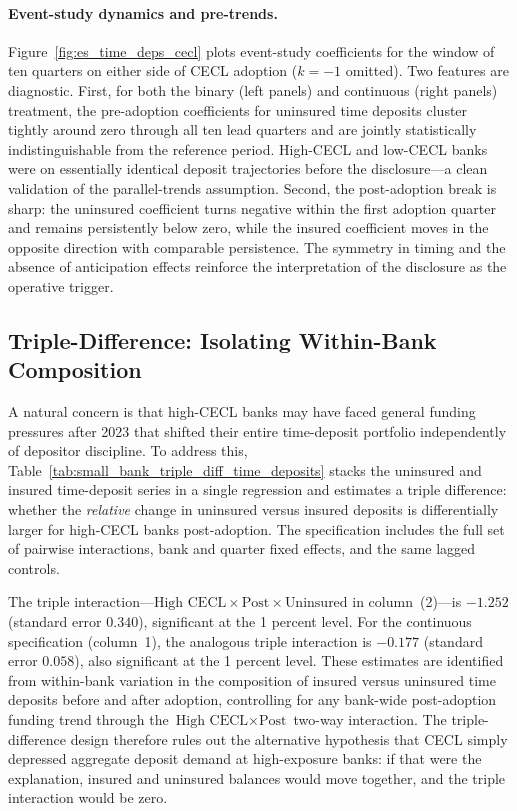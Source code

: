 \paragraph{Event-study dynamics and pre-trends.}
Figure~\ref{fig:es_time_deps_cecl} plots event-study coefficients for the
window of ten quarters on either side of CECL adoption ($k = -1$ omitted).
Two features are diagnostic. First, for both the binary (left panels) and
continuous (right panels) treatment, the pre-adoption coefficients for uninsured
time deposits cluster tightly around zero through all ten lead quarters and are
jointly statistically indistinguishable from the reference period. High-CECL and
low-CECL banks were on essentially identical deposit trajectories before the
disclosure---a clean validation of the parallel-trends assumption. Second, the
post-adoption break is sharp: the uninsured coefficient turns negative within the
first adoption quarter and remains persistently below zero, while the insured
coefficient moves in the opposite direction with comparable persistence. The
symmetry in timing and the absence of anticipation effects reinforce the
interpretation of the disclosure as the operative trigger.

\subsection{Triple-Difference: Isolating Within-Bank Composition}
\label{sec:results:triple}

A natural concern is that high-CECL banks may have faced general funding
pressures after 2023 that shifted their entire time-deposit portfolio
independently of depositor discipline. To address this, Table~\ref{tab:small_bank_triple_diff_time_deposits}
stacks the uninsured and insured time-deposit series in a single regression and
estimates a triple difference: whether the \textit{relative} change in uninsured
versus insured deposits is differentially larger for high-CECL banks
post-adoption. The specification includes the full set of pairwise interactions,
bank and quarter fixed effects, and the same lagged controls.

The triple interaction---$\text{High CECL} \times \text{Post} \times
\text{Uninsured}$ in column~(2)---is $-1.252$ (standard error $0.340$),
significant at the 1 percent level. For the continuous specification (column~1),
the analogous triple interaction is $-0.177$ (standard error $0.058$), also
significant at the 1 percent level. These estimates are identified from
within-bank variation in the composition of insured versus uninsured time
deposits before and after adoption, controlling for any bank-wide post-adoption
funding trend through the $\text{High CECL} \times \text{Post}$ two-way
interaction. The triple-difference design therefore rules out the alternative
hypothesis that CECL simply depressed aggregate deposit demand at high-exposure
banks: if that were the explanation, insured and uninsured balances would move
together, and the triple interaction would be zero.

